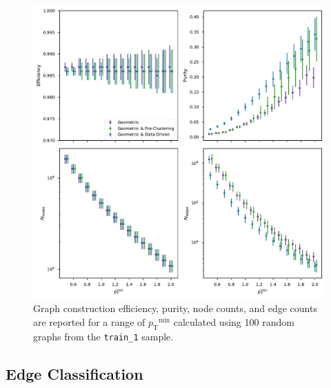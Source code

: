 \documentclass[twocolumn]{svjour3}
\newcommand{\pt}{\ensuremath{p_{\mathrm{T}}}\xspace}
\begin{document}
\begin{figure}[!htbp]
\centering
\captionsetup{labelfont=bf}
\includegraphics[width=\columnwidth]{graph_construction_measurements.pdf}
\caption{Graph construction efficiency, purity, node counts, and edge counts are reported for a range of $\pt^\mathrm{min}$ calculated using 100 random graphs from the \texttt{train\_1} sample.}
\label{fig:build-measurements} 
\end{figure}

\subsection{Edge Classification}
\label{sec:edgeclass}
\end{document}
